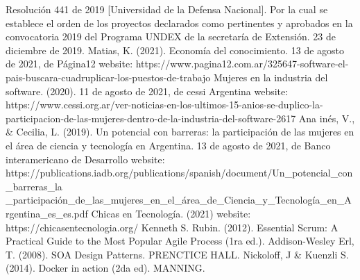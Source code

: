 \begin{thebibliography}{0}
   Resolución 441 de 2019 [Universidad de la Defensa Nacional]. Por la cual se establece el orden de los proyectos declarados como pertinentes y aprobados en la convocatoria 2019 del Programa UNDEX de la secretaría de Extensión. 23 de diciembre de 2019.
   Matias, K. (2021). Economía del conocimiento. 13 de agosto de 2021, de Página12 website: https://www.pagina12.com.ar/325647-software-el-pais-buscara-cuadruplicar-los-puestos-de-trabajo
   Mujeres en la industria del software. (2020). 11 de agosto de 2021, de cessi Argentina website: https://www.cessi.org.ar/ver-noticias-en-los-ultimos-15-anios-se-duplico-la-participacion-de-las-mujeres-dentro-de-la-industria-del-software-2617
   Ana inés, V., \& Cecilia, L. (2019). Un potencial con barreras: la participación de las mujeres en el área de ciencia y tecnología en Argentina. 13 de agosto de 2021, de Banco interamericano de Desarrollo website: https://publications.iadb.org/publications/spanish/document/Un\_potencial\_con\_barreras\_la
  \_participación\_de\_las\_mujeres\_en\_el\_área\_de\_Ciencia\_y\_Tecnología\_en\_Argentina\_es\_es.pdf 
   Chicas en Tecnología. (2021) website: https://chicasentecnologia.org/
   Kenneth S. Rubin. (2012). Essential Scrum: A Practical Guide to the Most Popular Agile Process (1ra ed.). Addison-Wesley
   Erl, T. (2008). SOA Design Patterns. PRENCTICE HALL.
   Nickoloff, J \& Kuenzli S. (2014). Docker in action (2da ed). MANNING.
   
\end{thebibliography}
